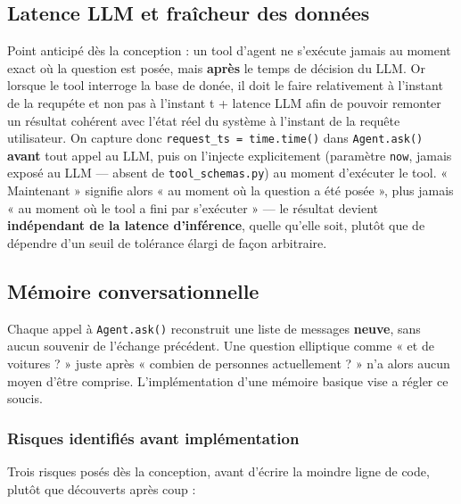 \documentclass[11pt,a4paper]{article}
\let\Oldsubsection\subsection
\renewcommand{\subsection}{\FloatBarrier\Oldsubsection}
\let\Oldsubsubsection\subsubsection
\renewcommand{\subsubsection}{\FloatBarrier\Oldsubsubsection}
\begin{document}
    \subsection{Latence LLM et fraîcheur des données}
    \label{sec:agent-latence-fraicheur}
    
    Point anticipé dès la conception : un tool d'agent ne s'exécute jamais au moment exact où la
    question est posée, mais \textbf{après} le temps de décision du LLM. Or lorsque le tool interroge la base de donée, il doit le faire relativement à l'instant de la requpéte et non pas à l'instant t + latence LLM afin de pouvoir remonter un résultat cohérent avec l'état réel du système à l'instant de la requête utilisateur. On capture donc \texttt{request\_ts =
    time.time()} dans \texttt{Agent.ask()} \textbf{avant} tout appel au
    LLM, puis on l'injecte explicitement (paramètre \texttt{now}, jamais
    exposé au LLM --- absent de \texttt{tool\_schemas.py}) au moment
    d'exécuter le tool. « Maintenant » signifie alors « au moment où la
    question a été posée », plus jamais « au moment où le tool a fini par
    s'exécuter » --- le résultat devient \textbf{indépendant de la latence
    d'inférence}, quelle qu'elle soit, plutôt que de dépendre d'un seuil de
    tolérance élargi de façon arbitraire.
    
    \subsection{Mémoire conversationnelle}
    \label{sec:agent-memoire}
    
    Chaque appel à \texttt{Agent.ask()}
    reconstruit une liste de messages \textbf{neuve}, sans aucun souvenir
    de l'échange précédent. Une question elliptique comme « et de
    voitures ? » juste après « combien de personnes actuellement ? » n'a
    alors aucun moyen d'être comprise. L'implémentation d'une mémoire basique vise a régler ce soucis.
    
    \subsubsection{Risques identifiés avant implémentation}
    
    Trois risques posés dès la conception, avant d'écrire la moindre ligne
    de code, plutôt que découverts après coup :
    
\end{document}
